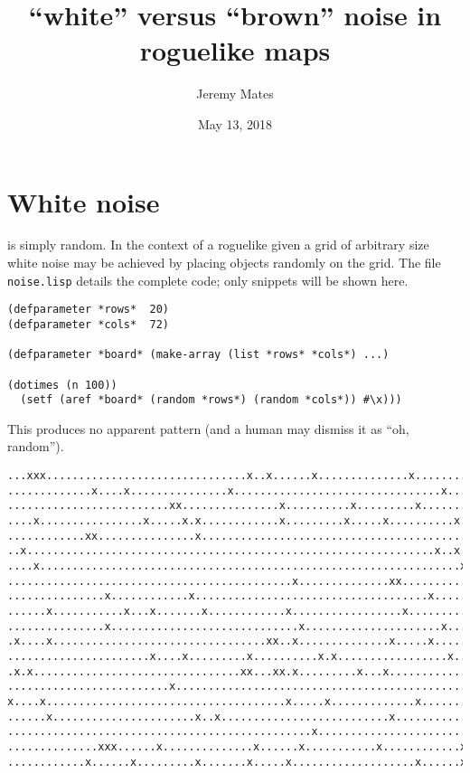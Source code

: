 \documentclass[12pt,a4paper]{article}
\title{``white'' versus ``brown'' noise in roguelike maps}
\author{Jeremy Mates}
\date{May 13, 2018}
\begin{document}

\maketitle

\setlength{\parindent}{0pt}

\section*{White noise}

is simply random\cite{bulmer2000music}. In the context of a roguelike
given a grid of arbitrary size white noise may be achieved by placing
objects randomly on the grid. The file \texttt{noise.lisp} details the
complete code; only snippets will be shown here.

\begin{verbatim}
(defparameter *rows*  20)
(defparameter *cols*  72)

(defparameter *board* (make-array (list *rows* *cols*) ...)

(dotimes (n 100))
  (setf (aref *board* (random *rows*) (random *cols*)) #\x)))
\end{verbatim}

This produces no apparent pattern (and a human may dismiss it as ``oh,
random'').

\begin{verbatim}
...xxx...............................x..x......x..............x.........
.............x....x...............x................................x....
.........................xx...............x..........x.........x........
....x................x.....x.x............x.........x.....x..........x..
............xx...............x..........................................
..x...............................................................x..x..
....x.................................................................x.
............................................x..............xx...........
...............x............x....................................x......
......x...........x...x.......x............x.................x..........
...............x.............................x.....................x....
.x....x.................................xx..x..............x.....x......
......................x....x.........x..........x.x.................x...
.x.x................................xx...xx.x.........x...x.............
.........................x..............................................
x....x.....................................x.....x.............x........
......x......................x..x..........................x............
...............................................x........................
..............xxx......x..............x......x...........x............x.
............x......x.........x.......x.....x...................x......x.
\end{verbatim}
\end{document}
